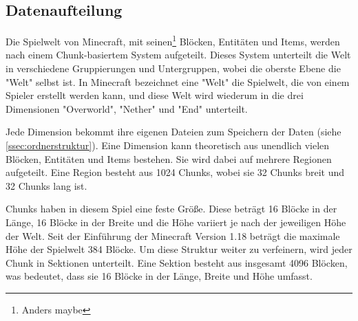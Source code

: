 


\subsection{Datenaufteilung} \label{ssec:datenaufteilung}
Die Spielwelt von Minecraft, mit seinen\footnote{Anders maybe} Blöcken, Entitäten und Items, werden nach einem Chunk-basiertem System aufgeteilt. Dieses System unterteilt die Welt in verschiedene Gruppierungen und Untergruppen, wobei die oberste Ebene die "Welt" selbst ist. In Minecraft bezeichnet eine "Welt" die Spielwelt, die von einem Spieler erstellt werden kann, und diese Welt wird wiederum in die drei Dimensionen "Overworld", "Nether" und "End" unterteilt.\cite{minecraftWorld}

Jede Dimension bekommt ihre eigenen Dateien zum Speichern der Daten (siehe \ref{ssec:ordnerstruktur}). Eine Dimension kann theoretisch aus unendlich vielen Blöcken, Entitäten und Items bestehen. Sie wird dabei auf mehrere Regionen aufgeteilt. Eine Region besteht aus 1024 Chunks, wobei sie 32 Chunks breit und 32 Chunks lang ist.\cite{minecraftRegionFile} 

Chunks haben in diesem Spiel eine feste Größe. Diese beträgt 16 Blöcke in der Länge, 16 Blöcke in der Breite und die Höhe variiert je nach der jeweiligen Höhe der Welt. Seit der Einführung der Minecraft Version 1.18 beträgt die maximale Höhe der Spielwelt 384 Blöcke.\cite{minecraftNewestJavaEdition}\cite{minecraftNewestBedrockEdition} Um diese Struktur weiter zu verfeinern, wird jeder Chunk in Sektionen unterteilt. Eine Sektion besteht aus insgesamt 4096 Blöcken, was bedeutet, dass sie 16 Blöcke in der Länge, Breite und Höhe umfasst.\cite{minecraftChunk}




